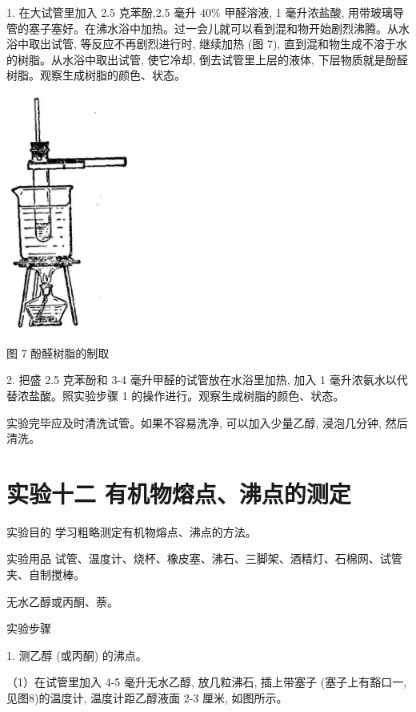 \documentclass[10pt]{article}
\begin{document}
1. 在大试管里加入 2.5 克苯酚,2.5 毫升 \({40}\%\) 甲醛溶液, 1 毫升浓盐酸, 用带玻璃导管的塞子塞好。在沸水浴中加热。过一会儿就可以看到混和物开始剧烈沸腾。从水浴中取出试管, 等反应不再剧烈进行时, 继续加热 (图 7), 直到混和物生成不溶于水的树脂。从水浴中取出试管, 使它冷却, 倒去试管里上层的液体, 下层物质就是酚醛树脂。观察生成树脂的颜色、状态。

\begin{center}
\includegraphics[max width=0.3\textwidth]{images/01912d16-be99-77bb-9535-4f3ed8d9946f_224_261015.jpg}
\end{center}

图 7 酚醛树脂的制取

2. 把盛 2.5 克苯酚和 3-4 毫升甲醛的试管放在水浴里加热, 加入 1 毫升浓氨水以代替浓盐酸。照实验步骤 1 的操作进行。观察生成树脂的颜色、状态。

实验完毕应及时清洗试管。如果不容易洗净, 可以加入少量乙醇, 浸泡几分钟, 然后清洗。

\section*{实验十二 有机物熔点、沸点的测定}

实验目的 学习粗略测定有机物熔点、沸点的方法。

实验用品 试管、温度计、烧杯、橡皮塞、沸石、三脚架、酒精灯、石棉网、试管夹、自制搅棒。

无水乙醇或丙酮、萘。

实验步骤

1. 测乙醇 (或丙酮) 的沸点。

（1）在试管里加入 4-5 毫升无水乙醇, 放几粒沸石, 插上带塞子 (塞子上有豁口一, 见图8)的温度计, 温度计距乙醇液面 2-3 厘米, 如图所示。
\end{document}
